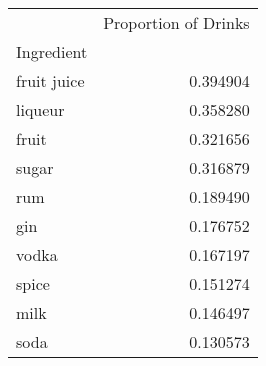 \documentclass[preview]{standalone}
\begin{document}
    \begin{tabular}{lr}
\toprule
{} &  Proportion of Drinks \\
Ingredient  &                       \\
\midrule
fruit juice &              0.394904 \\
liqueur     &              0.358280 \\
fruit       &              0.321656 \\
sugar       &              0.316879 \\
rum         &              0.189490 \\
gin         &              0.176752 \\
vodka       &              0.167197 \\
spice       &              0.151274 \\
milk        &              0.146497 \\
soda        &              0.130573 \\
\bottomrule
\end{tabular}

    
\end{document}
